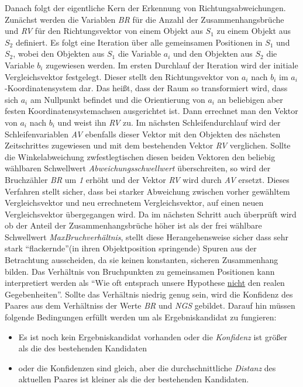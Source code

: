 Danach folgt der eigentliche Kern der Erkennung von Richtungsabweichungen.
Zunächst werden die Variablen \textit{BR} für die Anzahl der Zusammenhangsbrüche und \textit{RV} für den Richtungsvektor von einem Objekt aus \textit{$S_1$} zu einem Objekt aus \textit{$S_2$} definiert.
Es folgt eine Iteration über alle gemeinsamen Positionen in \textit{$S_1$} und \textit{$S_2$}, wobei den Objekten aus \textit{$S_1$} die Variable \textit{$a_i$} und den Objekten aus \textit{$S_2$} die Variable \textit{$b_i$} zugewiesen werden.
Im ersten Durchlauf der Iteration wird der initiale Vergleichsvektor festgelegt.
Dieser stellt den Richtungsvektor von \textit{$a_i$} nach \textit{$b_i$} im \textit{$a_i$}-Koordinatensystem dar.
Das heißt, dass der Raum so transformiert wird, dass sich \textit{$a_i$} am Nullpunkt befindet und die Orientierung von \textit{$a_i$} an beliebigen aber festen Koordinatensystemachsen ausgerichtet ist.
Dann errechnet man den Vektor von \textit{$a_i$} nach \textit{$b_i$} und weist ihn \textit{RV} zu.
Im nächsten Schleifendurchlauf wird der Schleifenvariablen \textit{AV} ebenfalls dieser Vektor mit den Objekten des nächsten Zeitschrittes zugewiesen und  mit dem bestehenden Vektor \textit{RV} verglichen.
Sollte die Winkelabweichung zwfestlegtischen diesen beiden Vektoren den beliebig wählbaren Schwellwert \textit{Abweichungsschwellwert} überschreiten, so wird der Bruchzähler \textit{BR} um \textit{1} erhöht und der Vektor \textit{RV} wird durch \textit{AV} ersetzt.
Dieses Verfahren stellt sicher, dass bei starker Abweichung zwischen vorher gewähltem Vergleichsvektor und neu errechnetem Vergleichsvektor, auf einen neuen Vergleichsvektor übergegangen wird.
Da im nächsten Schritt auch überprüft wird ob der Anteil der Zusammenhangsbrüche höher ist als der frei wählbare Schwellwert \textit{MaxBruchverhältnis}, stellt diese Herangehensweise sicher dass sehr stark "`flackernde"'(in ihren Objektposition springende) Spuren aus der Betrachtung ausscheiden, da sie keinen konstanten, sicheren Zusammenhang bilden.
Das Verhältnis von Bruchpunkten zu gemeinsamen Positionen kann interpretiert werden als "`Wie oft entsprach unsere Hypothese \underline{nicht} den realen Gegebenheiten"'.
Sollte das Verhältnis niedrig genug sein, wird die Konfidenz des Paares aus dem Verhältniss der Werte \textit{BR} und \textit{NGS} gebildet.
Darauf hin müssen folgende Bedingungen erfüllt werden um als Ergebniskandidat zu fungieren:

\begin{itemize}
 \item Es ist noch kein Ergebniskandidat vorhanden oder die \textit{Konfidenz} ist größer als die des bestehenden Kandidaten
 \item oder die Konfidenzen sind gleich, aber die durchschnittliche \textit{Distanz} des aktuellen Paares ist kleiner als die der bestehenden Kandidaten.
\end{itemize}

